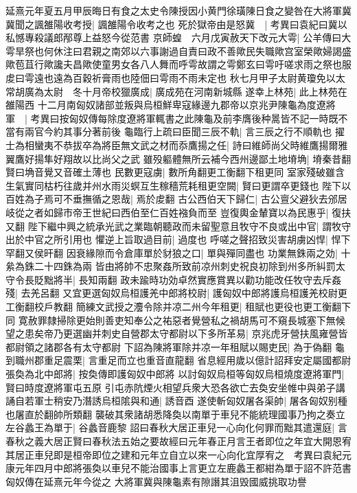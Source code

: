 延熹元年夏五月甲辰晦日有食之太史令陳授因小黄門徐璜陳日食之變咎在大將軍冀冀聞之諷雒陽收考授|{
	諷雒陽令收考之也}
死於獄帝由是怒冀　|{
	考異曰袁紀曰冀以私憾專殺議郎邴尊上益怒今從范書}
京師蝗　六月戊寅赦天下改元大雩|{
	公羊傳曰大雩旱祭也何休注曰君親之南郊以六事謝過自責曰政不善歟民失職歟宫室榮歟婦謁盛歟苞苴行歟讒夫昌歟使童男女各八人舞而呼雩故謂之雩鄭玄曰雩吁嗟求雨之祭也服䖍曰雩遠也遠為百穀祈膏雨也陸佃曰雩雨不雨未定也}
秋七月甲子太尉黄瓊免以太常胡廣為太尉　冬十月帝校獵廣成|{
	廣成苑在河南新城縣}
遂幸上林苑|{
	此上林苑在雒陽西}
十二月南匈奴諸部並叛與烏桓鮮卑寇緣邊九郡帝以京兆尹陳龜為度遼將軍　|{
	考異曰按匈奴傳每除度遼將軍輒書之此陳龜及前李膺後种暠皆不記一時既不當有兩官今約其事分著前後}
龜臨行上疏曰臣聞三辰不軌|{
	言三辰之行不順軌也}
擢士為相蠻夷不恭拔卒為將臣無文武之材而忝鷹揚之任|{
	詩曰維師尚父時維鷹揚爾雅翼鷹好揚隼好翔故以比尚父之武}
雖殁軀體無所云補今西州邊鄙土地塉埆|{
	塉秦昔翻賢曰埆音覺又音確土薄也}
民數更寇虜|{
	數所角翻更工衡翻下租更同}
室家殘破雖含生氣實同枯朽往歲并州水雨災螟互生稼穡荒耗租更空闕|{
	賢曰更謂卒更錢也}
陛下以百姓為子焉可不垂撫循之恩哉|{
	焉於䖍翻}
古公西伯天下歸仁|{
	古公亶父避狄去邠居岐從之者如歸市帝王世紀曰西伯至仁百姓襁負而至}
豈復輿金輦寶以為民惠乎|{
	復扶又翻}
陛下繼中興之統承光武之業臨朝聽政而未留聖意且牧守不良或出中官|{
	謂牧守出於中官之所引用也}
懼逆上旨取過目前|{
	過度也}
呼嗟之聲招致災害胡虜凶悍|{
	悍下罕翻又侯旰翻}
因衰緣隙而令倉庫單於豺狼之口|{
	單與殫同盡也}
功業無銖兩之効|{
	十絫為銖二十四銖為兩}
皆由將帥不忠聚姦所致前凉州刺史祝良初除到州多所糾罰太守令長貶黜將半|{
	長知兩翻}
政未踰時功効卓然實應賞異以勸功能改任牧守去斥姦殘|{
	去羌呂翻}
又宜更選匈奴烏桓護羌中郎將校尉|{
	護匈奴中郎將護烏桓護羌校尉更工衡翻校戶教翻}
簡練文武授之灋令除并凉二州今年租更|{
	租賦也更役也更工衡翻下同}
寛赦罪隸掃除更始則善吏知奉公之祐惡者覺營私之禍胡馬可不窺長城塞下無候望之患矣帝乃更選幽并刺史自營郡太守都尉以下多所革易|{
	京兆虎牙營扶風雍營皆都尉領之諸郡各有太守都尉}
下詔為陳將軍除并凉一年租賦以賜吏民|{
	為于偽翻}
龜到職州郡重足震栗|{
	言重足而立也重音直龍翻}
省息經用歲以億計詔拜安定屬國都尉張奐為北中郎將|{
	按奐傳即護匈奴中郎將}
以討匈奴烏桓等匈奴烏桓燒度遼將軍門|{
	賢曰時度遼將軍屯五原}
引屯赤阬煙火相望兵衆大恐各欲亡去奐安坐帷中與弟子講誦自若軍士稍安乃潛誘烏桓隂與和通|{
	誘音酉}
遂使斬匈奴屠各渠帥|{
	屠各匈奴别種也屠直於翻帥所類翻}
襲破其衆諸胡悉降奐以南單于車兒不能統理國事乃拘之奏立左谷蠡王為單于|{
	谷蠡音鹿黎}
詔曰春秋大居正車兒一心向化何罪而黜其遣還庭|{
	言春秋之義大居正賢曰春秋法五始之要故經曰元年春正月言王者即位之年宜大開恩宥其居正車兒即是桓帝即位之建和元年立自立以來一心向化宜厚宥之　考異曰袁紀元康元年四月中郎將張奐以車兒不能治國事上言更立左鹿蠡王都紺為單于詔不許范書匈奴傳在延熹元年今從之}
大將軍冀與陳龜素有隙譖其沮毁國威挑取功譽

